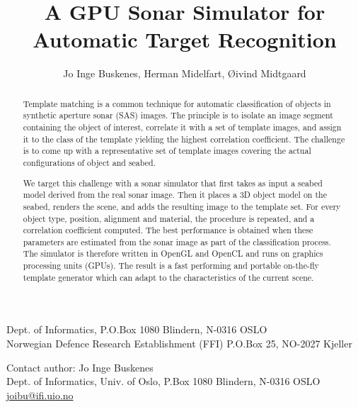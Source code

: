 \documentclass[
   UAM                                          %
 , 12pt                                         %
 , bibtex                                       %
 , layout
]{common/mytemplate}
\begin{document}
% 

\pagestyle{plain}



\title{A GPU Sonar Simulator for Automatic Target Recognition}%
%
\author{Jo Inge Buskenes\firstAddress, Herman Midelfart\secondAddress, \O{}ivind Midtgaard\secondAddress}%
%
\begin{contact}
  \firstAddress Dept. of Informatics, P.O.Box 1080 Blindern, N-0316 OSLO\\
  \secondAddress Norwegian Defence Research Establishment (FFI) P.O.Box 25, NO-2027 Kjeller
\end{contact}%
%
\begin{contact}
Contact author: Jo Inge Buskenes\\
Dept. of Informatics, Univ. of Oslo, P.Box 1080 Blindern, N-0316 OSLO\\
\href{mailto:joibu@ifi.uio.no}{joibu@ifi.uio.no}
\end{contact}%
%
\begin{abstract}
Template matching is a common technique for automatic classification of objects in synthetic aperture sonar (SAS) images. The principle is to isolate an image segment containing the object of interest, correlate it with a set of template images, and assign it to the class of the template yielding the highest correlation coefficient. The challenge is to come up with a representative set of template images covering the actual configurations of object and seabed.

We target this challenge with a sonar simulator that first takes as input a seabed model derived from the real sonar image. Then it places a 3D object model on the seabed, renders the scene, and adds the resulting image to the template set. For every object type, position, alignment and material, the procedure is repeated, and a correlation coefficient computed. The best performance is obtained when these parameters are estimated from the sonar image as part of the classification process. The simulator is therefore written in OpenGL and OpenCL and runs on graphics processing units (GPUs). The result is a fast performing and portable on-the-fly template generator which can adapt to the characteristics of the current scene.
\end{abstract}%
%
\end{document}

